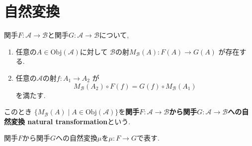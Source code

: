 \section{自然変換}
\begin{Def}
関手$F:\mathscr{A}\rightarrow\mathscr{B}$と関手$G:\mathscr{A}\rightarrow\mathscr{B}$について,
\begin{enumerate}
\item 任意の$A\in\mathrm{Obj}(\mathscr{A})$に対して
$\mathscr{B}$の射$M_{\mathscr{B}}(A):F(A)\rightarrow G(A)$
が存在する.
\item 任意の$\mathscr{A}$の射$f:A_1\rightarrow A_2$
が
\[
M_{\mathscr{B}}(A_2)\circ F(f)
=G(f)\circ M_{\mathscr{B}}(A_1)
\]
を満たす.
\end{enumerate}
このとき
$\{M_{\mathscr{B}}(A)\mid A\in\mathrm{Obj}(\mathscr{A})\}$を{\bf 関手$F:\mathscr{A}\rightarrow\mathscr{B}$から関手$G:\mathscr{A}\rightarrow\mathscr{B}$への自然変換 natural transformation}という.
\end{Def}
\begin{Notation}
関手$F$から関手$G$への自然変換$\mu$を$\mu:F\rightarrow G$で表す.
\end{Notation}
\begin{comment}
\begin{Notation}
関手$F$から関手$G$への自然変換$\alpha$を次の図表で表す.
\end{Notation}
\end{comment}
\begin{comment}
\section{Haskにおける自然変換}
\subsection{concat}
\subsection{List関手からMaybe関手への自然変換safehead}
\subsection{concatとsafeheadの垂直合成}
\subsection{二分木からリストへのflatten関数}

\section{Haskにおける定数関手}
\subsection{length関数}
\end{comment}